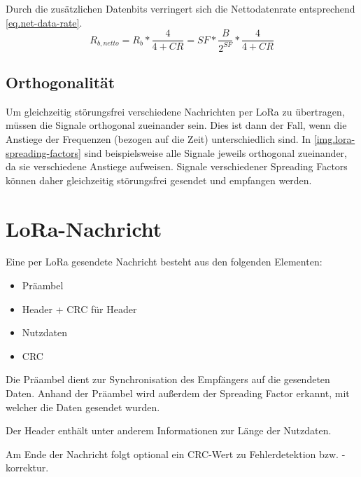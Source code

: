 Durch die zusätzlichen Datenbits verringert sich die Nettodatenrate entsprechend \autoref{eq.net-data-rate}.
\begin{equation}
	R_{b,netto} = R_b * \frac{4}{4 + CR} = SF * \frac{B}{2^{SF}} * \frac{4}{4 + CR}
	\label{eq.net-data-rate}
\end{equation}


\subsection{Orthogonalität}
Um gleichzeitig störungsfrei verschiedene Nachrichten per LoRa zu übertragen, müssen die Signale orthogonal zueinander sein.
Dies ist dann der Fall, wenn die Anstiege der Frequenzen (bezogen auf die Zeit) unterschiedlich sind.
In \autoref{img.lora-spreading-factors} sind beispielsweise alle Signale jeweils orthogonal zueinander, da sie verschiedene Anstiege aufweisen.
Signale verschiedener Spreading Factors können daher gleichzeitig störungsfrei gesendet und empfangen werden.
\cite{loraorthogonal}


\section{LoRa-Nachricht}
Eine per LoRa gesendete Nachricht besteht aus den folgenden Elementen:\cite{loralimits}
\begin{itemize}\singlespacing\setlength\itemsep{-0.2em}
\item Präambel
\item Header + \gls{CRC} für Header
\item Nutzdaten
\item \gls{CRC}
\end{itemize}

Die Präambel dient zur Synchronisation des Empfängers auf die gesendeten Daten.
Anhand der Präambel wird außerdem der Spreading Factor erkannt, mit welcher die Daten gesendet wurden.

Der Header enthält unter anderem Informationen zur Länge der Nutzdaten.

Am Ende der Nachricht folgt optional ein CRC-Wert zu Fehlerdetektion bzw. -korrektur.
